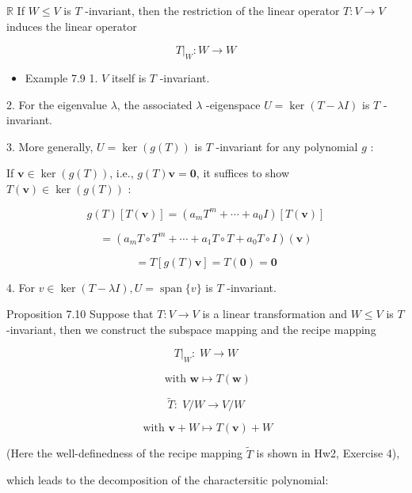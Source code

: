 \documentclass[11pt]{article}
\begin{document}
\(\mathbb{R}\) If \(W \leq  V\) is \(T\) -invariant, then the restriction of the linear operator \(T : V \rightarrow  V\) induces the linear operator

\[
{\left. T\right| }_{W} : W \rightarrow  W
\]

\begin{itemize}
\item Example 7.9 1. \(V\) itself is \(T\) -invariant.
\end{itemize}

2. For the eigenvalue \(\lambda\), the associated \(\lambda\) -eigenspace \(U = \ker \left( {T - {\lambda I}}\right)\) is \(T\) -invariant.

3. More generally, \(U = \ker \left( {g\left( T\right) }\right)\) is \(T\) -invariant for any polynomial \(g\) :

If \(\mathbf{v} \in  \ker \left( {g\left( T\right) }\right)\), i.e., \(g\left( T\right) \mathbf{v} = \mathbf{0}\), it suffices to show \(T\left( \mathbf{v}\right)  \in  \ker \left( {g\left( T\right) }\right)\) :

\[
g\left( T\right) \left\lbrack  {T\left( \mathbf{v}\right) }\right\rbrack   = \left( {{a}_{m}{T}^{m} + \cdots  + {a}_{0}I}\right) \left\lbrack  {T\left( \mathbf{v}\right) }\right\rbrack
\]

\[
= \left( {{a}_{m}T \circ  {T}^{m} + \cdots  + {a}_1T \circ  T + {a}_{0}T \circ  I}\right) \left( \mathbf{v}\right)
\]

\[
= T\left\lbrack  {g\left( T\right) \mathbf{v}}\right\rbrack   = T\left( \mathbf{0}\right)  = \mathbf{0}
\]

4. For \(v \in  \ker \left( {T - {\lambda I}}\right) ,U = \operatorname{span}\{ v\}\) is \(T\) -invariant.

Proposition 7.10 Suppose that \(T : V \rightarrow  V\) is a linear transformation and \(W \leq  V\) is \(T\) -invariant, then we construct the subspace mapping and the recipe mapping

\[
{\left. T\right| }_{W} : \;W \rightarrow  W \tag{7.2a}
\]

\[
\text{ with }\mathbf{w} \mapsto  T\left( \mathbf{w}\right)
\]

\[
\widetilde{T} : \;V/W \rightarrow  V/W \tag{7.2b}
\]

\[
\text{ with }\mathbf{v} + W \mapsto  T\left( \mathbf{v}\right)  + W
\]

(Here the well-definedness of the recipe mapping \(\widetilde{T}\) is shown in Hw2, Exercise 4),

which leads to the decomposition of the charactersitic polynomial:
\end{document}
